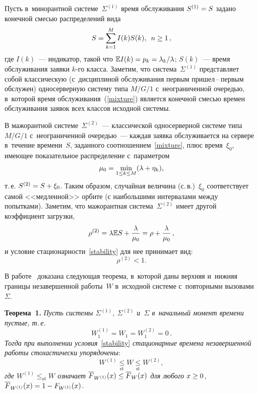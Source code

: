 \begin{multicols}{2}
Пусть в~минорантной сис\-те\-ме~$\Sigma^{(1)}$ время обслуживания $S^{(1)}\hm=S$ задано 
конечной смесью распределений вида
\begin{equation}
\label{mixture}
S=\sum\limits_{k=1}^M I(k) S(k), \enskip n\ge1\,,
\end{equation}
где  $I(k)$~--- индикатор, такой что  $\mathbb{E} I(k)\hm=p_k=\lambda_k/\lambda$; $S(k)$~--- время  обслуживания заявки $k$-го класса.
Заметим, что сис\-те\-ма~$\Sigma^{(1)}$ пред\-став\-ля\-ет собой классическую 
(с~дисциплиной обслуживания первым при\-шел\,--\,пер\-вым обслужен) односерверную сис\-те\-му 
типа $M/G/1$ с~неограниченной очередью, в~которой время обслуживания~(\ref{mixture})
является конечной смесью времен обслуживания заявок всех классов исходной 
сис\-те\-мы.

В мажорантной системе~$\Sigma^{(2)}$~--- классической односерверной сис\-те\-ме 
типа  $M/G/1$ с~неограниченной оче\-редью~--- каждая заявка обслуживается на 
сервере в~течение времени~$S$, заданного соотношением~\eqref{mixture},  плюс 
время~$\xi_0$, имеющее показательное распределение с~па\-ра\-мет\-ром  
$$
\mu_0=\min\limits_{1\le k\le M} (\lambda\hm+\eta_k),
$$
 т.\,е.
$S^{(2)} \hm= S\hm +\xi_0$.
Таким образом, случайная величина (с.\,в.)~$\xi_0$ соответствует самой 
<<медленной>> орбите (с наибольшими интервалами между попытками). Заметим, что 
мажорантная сис\-те\-ма~$\Sigma^{(2)}$ имеет другой коэффициент загрузки,
\begin{equation*}
 \rho^{(2)}=\lambda \mathbb{E} S+\displaystyle\frac{\displaystyle \lambda\mathstrut}{\displaystyle \mu_0\mathstrut}=\rho+\displaystyle\frac{\displaystyle \lambda\mathstrut}{\displaystyle \mu_0\mathstrut}\,,
\end{equation*}
и условие стационарности~\eqref{stability} для нее принимает вид:
$$
\rho^{(2)}<1.
$$

В работе~\cite{mathematics2022}  доказана сле\-ду\-ющая тео\-ре\-ма, в~которой даны 
верхняя и~нижняя границы незавершенной работы~$W$ в~исходной сис\-те\-ме 
с~повторными вызовами~$\Sigma$.

\smallskip

\noindent
\textbf{Теорема~1.}
\textit{Пусть сис\-те\-мы  $\Sigma^{(1)}$, $\Sigma^{(2)}$ и~$\Sigma$ в~начальный момент времени 
пустые, т.\,е.}
 \begin{equation*}
W_1^{(1)}=W_1=W_1^{(2)}=0\,.
 \end{equation*}
\textit{Тогда при  выполнении условия}~\eqref{stability} \textit{стационарные времена 
незавершенной работы стохастически упорядочены}:
 \begin{equation}
 \label{theor1-1}
 W^{(1)}\underset{\mathrm{st}}\le W \underset{\mathrm{st}}\le W^{(2)},
 \end{equation}
\textit{где $W^{(1)}\le_{\mathrm{st}} W$ означает $\overline F_{W^{(1)}} (x) \hm\le 
\overline F_{W} (x) $ для любого $x\hm\ge 0$, $\overline F_{W^{(1)}}  (x)\hm= 1\hm-  
F_{W^{(1)}} (x)$}.



\end{multicols}
